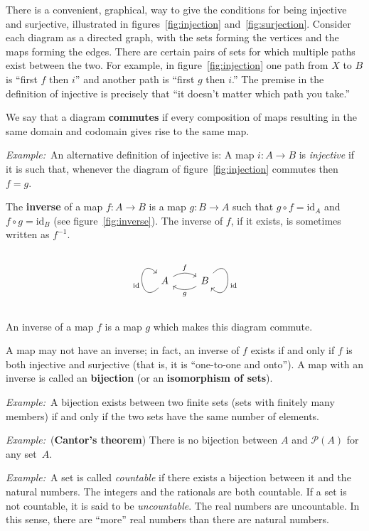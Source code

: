 \documentclass[12pt, a4paper]{article}
\newcommand{\defn}[1]{\textbf{#1}}
\newcommand{\eg}{\emph{Example:}\relax}
\newcommand{\id}{\text{id}}
\begin{document}
There is a convenient, graphical, way to give the conditions for being
injective and surjective, illustrated in figures~\ref{fig:injection}
and~\ref{fig:surjection}. Consider each diagram as a directed graph,
with the sets forming the vertices and the maps forming the
edges. There are certain pairs of sets for which multiple paths exist
between the two. For example, in figure~\ref{fig:injection} one path
from $X$ to $B$ is “first $f$ then $i$” and another path is “first $g$
then $i$.” The premise in the definition of injective is precisely
that “it doesn't matter which path you take.”

We say that a diagram \defn{commutes} if every composition of maps
resulting in the same domain and codomain gives rise to the same map.

\eg\ An alternative definition of injective is: A map $i\colon A\to B$
is \emph{injective} if it is such that, whenever the diagram of
figure~\ref{fig:injection} commutes then $f=g$.

The \defn{inverse} of a map $f\colon A\to B$ is a map $g\colon B\to A$
such that $g\circ f = \id_A$ and $f\circ g = \id_B$ (see
figure~\ref{fig:inverse}). The inverse of $f$, if it exists, is
sometimes written as $f^{-1}$.
\begin{sidefigure}
  \[\begin{tikzcd}
  A \arrow[loop left, out=225, in=135, distance=3em, "\id"] \arrow[r, bend
      left, "f"] &
    B \arrow[l, bend left, "g"] \arrow[loop right, out=45, in=-45,
      distance=3em, "\id"]
  \end{tikzcd}\]
  \caption{An inverse of a map $f$ is a map $g$ which makes this
    diagram commute.\label{fig:inverse}}
\end{sidefigure}
A map may not have an inverse; in fact, an
inverse of $f$ exists if and only if $f$ is both injective and
surjective (that is, it is “one-to-one and onto”). A map with an
inverse is called an \defn{bijection} (or an \defn{isomorphism of
  sets}).

\eg\ A bijection exists between two finite sets (sets with finitely
many members) if and only if the two sets have the same number of
elements.

\eg\ (\defn{Cantor's theorem}) There is no bijection between $A$ and
$\mathcal{P}(A)$ for any set~$A$.

\eg\ A set is called \emph{countable} if there exists a bijection
between it and the natural numbers. The integers and the rationals are
both countable. If a set is not countable, it is said to be
\emph{uncountable}. The real numbers are uncountable. In this sense,
there are ``more'' real numbers than there are natural numbers.
\end{document}
